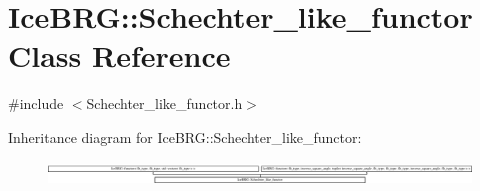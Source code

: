 \hypertarget{classIceBRG_1_1Schechter__like__functor}{\section{Ice\-B\-R\-G\-:\-:Schechter\-\_\-like\-\_\-functor Class Reference}
\label{classIceBRG_1_1Schechter__like__functor}
}


{\ttfamily \#include $<$Schechter\-\_\-like\-\_\-functor.\-h$>$}

Inheritance diagram for Ice\-B\-R\-G\-:\-:Schechter\-\_\-like\-\_\-functor\-:\begin{figure}[H]
\begin{center}
\leavevmode
\includegraphics[height=0.639269cm]{classIceBRG_1_1Schechter__like__functor}
\end{center}
\end{figure}
